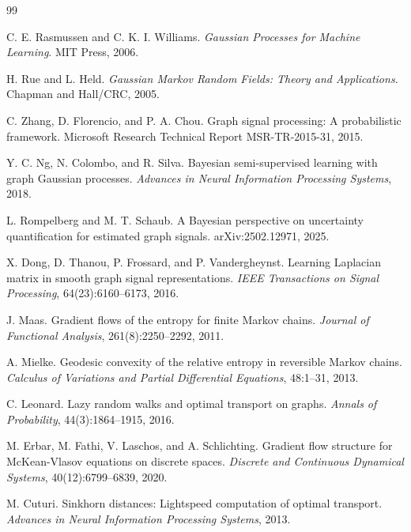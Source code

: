 \documentclass[11pt]{article}
\numberwithin{equation}{section}
\begin{document}
\begin{thebibliography}{99}

C. E. Rasmussen and C. K. I. Williams.
\newblock \emph{Gaussian Processes for Machine Learning}.
\newblock MIT Press, 2006.

H. Rue and L. Held.
\newblock \emph{Gaussian Markov Random Fields: Theory and Applications}.
\newblock Chapman and Hall/CRC, 2005.

C. Zhang, D. Florencio, and P. A. Chou.
\newblock Graph signal processing: A probabilistic framework.
\newblock Microsoft Research Technical Report MSR-TR-2015-31, 2015.

Y. C. Ng, N. Colombo, and R. Silva.
\newblock Bayesian semi-supervised learning with graph Gaussian processes.
\newblock \emph{Advances in Neural Information Processing Systems}, 2018.

L. Rompelberg and M. T. Schaub.
\newblock A Bayesian perspective on uncertainty quantification for estimated graph signals.
\newblock arXiv:2502.12971, 2025.

X. Dong, D. Thanou, P. Frossard, and P. Vandergheynst.
\newblock Learning Laplacian matrix in smooth graph signal representations.
\newblock \emph{IEEE Transactions on Signal Processing}, 64(23):6160--6173, 2016.

J. Maas.
\newblock Gradient flows of the entropy for finite Markov chains.
\newblock \emph{Journal of Functional Analysis}, 261(8):2250--2292, 2011.

A. Mielke.
\newblock Geodesic convexity of the relative entropy in reversible Markov chains.
\newblock \emph{Calculus of Variations and Partial Differential Equations}, 48:1--31, 2013.

C. Leonard.
\newblock Lazy random walks and optimal transport on graphs.
\newblock \emph{Annals of Probability}, 44(3):1864--1915, 2016.

M. Erbar, M. Fathi, V. Laschos, and A. Schlichting.
\newblock Gradient flow structure for McKean-Vlasov equations on discrete spaces.
\newblock \emph{Discrete and Continuous Dynamical Systems}, 40(12):6799--6839, 2020.

M. Cuturi.
\newblock Sinkhorn distances: Lightspeed computation of optimal transport.
\newblock \emph{Advances in Neural Information Processing Systems}, 2013.


\end{thebibliography}
\end{document}
